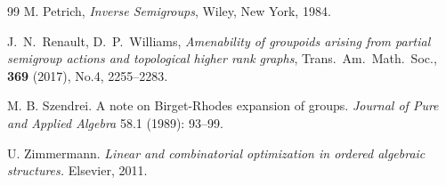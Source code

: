 \documentclass{amsart}
\newcommand{\0}{{\vartheta}}
\theoremstyle{definition}
\theoremstyle{remark}
\numberwithin{equation}{section}
\newtheorem*{Theorem A}{\textbf{Theorem A}}
\newtheorem*{Corollary E}{\textbf{Corollary E}}
\newtheorem*{Corollary F}{\textbf{Corollary F}}
\newtheorem*{Theorem B}{\textbf{Theorem B}}
\newtheorem*{Theorem C}{\textbf{Theorem C}}
\newtheorem*{Theorem D}{\textbf{Theorem B}}
\newtheorem*{p a}{\textbf{Proof of  Theorem A}}
\newtheorem*{p b}{\textbf{Proof of Theorem B}}
\newtheorem*{p c}{\textbf{Proof of  Theorem C}}
\newtheorem*{p d}{\textbf{Proof of  Theorem D}}
\begin{document}
\begin{thebibliography}{99}
 M. Petrich, {\em Inverse Semigroups}, Wiley, New York, 1984.

 J.\ N.\ Renault,  D.\ P.\ Williams, {\it Amenability of groupoids arising from partial semigroup actions and topological higher rank graphs},
  Trans.\ Am.\ Math.\ Soc.,  {\bf 369}  (2017), No.4, 2255--2283.

 M. B. Szendrei. A note on Birget-Rhodes expansion of groups. {\em Journal of Pure and Applied Algebra} 58.1 (1989): 93--99.

 U. Zimmermann. {\em Linear and combinatorial optimization in ordered algebraic structures.} Elsevier, 2011.
\end{thebibliography}
\end{document}
